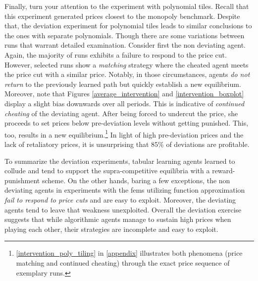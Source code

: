Finally, turn your attention to the experiment with polynomial tiles. Recall that this experiment generated prices closest to the monopoly benchmark. Despite that, the deviation experiment for polynomial tiles leads to similar conclusions to the ones with separate polynomials. Though there are some variations between runs that warrant detailed examination. Consider first the non deviating agent. Again, the majority of runs exhibits a failure to respond to the price cut. However, selected runs show a \emph{matching} strategy where the cheated agent meets the price cut with a similar price. Notably, in those circumstances, agents \emph{do not return} to the previously learned path but quickly establish a new equilibrium. Moreover, note that Figures \ref{average_intervention} and \ref{intervention_boxplot} display a slight bias downwards over all periods. This is indicative of \emph{continued cheating} of the deviating agent. After being forced to undercut the price, she proceeds to set prices below pre-deviation levels without getting punished. This, too, results in a new equilibrium.\footnote{\autoref{intervention_poly_tiling} in \autoref{appendix} illustrates both phenomena (price matching and continued cheating) through the exact price sequence of exemplary runs.} In light of high pre-deviation prices and the lack of retaliatory prices, it is unsurprising that 85\% of deviations are profitable.

To summarize the deviation experiments, tabular learning agents learned to collude and tend to support the  supra-competitive equilibria with a reward-punishment scheme. On the other hands, baring a few exceptions, the non deviating agents in experiments with the \gls{fem}s utilizing function approximation \emph{fail to respond to price cuts} and are easy to exploit. Moreover, the deviating agents tend to leave that weakness unexploited. Overall the deviation exercise suggests that while algorithmic agents manage to sustain high prices when playing each other, their strategies are incomplete and easy to exploit.

